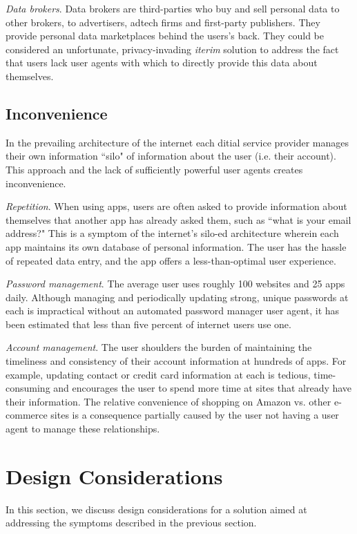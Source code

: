 \documentclass[11pt, oneside]{article}   	%
\begin{document}
\emph{Data brokers}. Data brokers are third-parties who buy and sell personal data to other brokers, to advertisers, adtech firms and first-party publishers. They provide personal data marketplaces behind the users's back. They could be considered an unfortunate, privacy-invading \emph{iterim} solution to address the fact that users lack user agents with which to directly provide this data about themselves. 

\subsection{Inconvenience}
In the prevailing architecture of the internet each ditial service provider manages their own information ``silo" of information about the user (i.e. their account). This approach and the lack of sufficiently powerful user agents creates inconvenience.

\emph{Repetition}. When using apps, users are often asked to provide information about themselves that another app has already asked them, such as ``what is your email address?" This is a symptom of the internet's silo-ed architecture wherein each app maintains its own database of personal information. The user has the hassle of repeated data entry, and the app offers a less-than-optimal user experience.

\emph{Password management}. The average user uses roughly 100 websites and 25 apps daily. Although managing and periodically updating strong, unique passwords at each is impractical without an automated password manager user agent, it has been estimated that less than five percent of internet users use one. 

\emph{Account management}. The user shoulders the burden of maintaining the timeliness and consistency of their account information at hundreds of apps. For example, updating contact or credit card information at each is tedious, time-consuming and encourages the user to spend more time at sites that already have their information. The relative convenience of shopping on Amazon vs. other e-commerce sites is a consequence partially caused by the user not having a user agent to manage these relationships.

\section{Design Considerations} %

In this section, we discuss design considerations for a solution aimed at addressing the symptoms described in the previous section.
\end{document}
